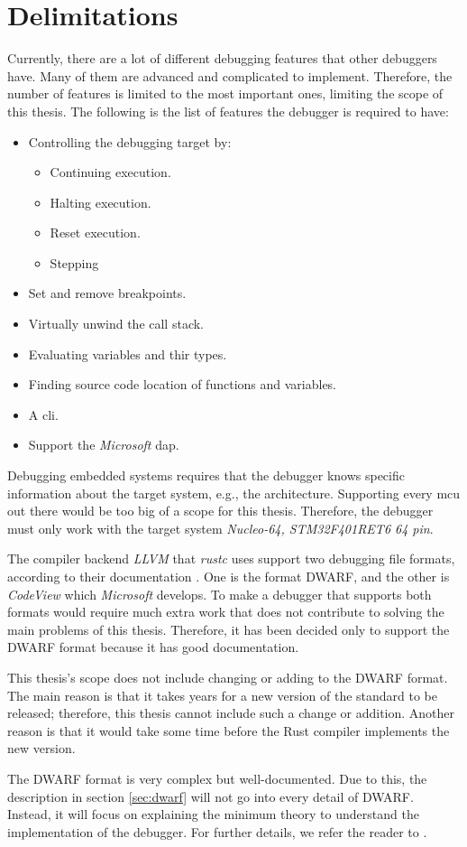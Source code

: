 \section{Delimitations}
\label{sec:delimitations}
Currently, there are a lot of different debugging features that other debuggers have.
Many of them are advanced and complicated to implement.
Therefore, the number of features is limited to the most important ones, limiting the scope of this thesis.
The following is the list of features the debugger is required to have:


\begin{itemize} \label{list:debuggerfeatures}
  \item Controlling the debugging target by:
  \begin{itemize}
    \item Continuing execution.
    \item Halting execution.
    \item Reset execution.
    \item Stepping
  \end{itemize}
  \item Set and remove breakpoints.
  \item Virtually unwind the call stack.
  \item Evaluating variables and thir types.
  \item Finding source code location of functions and variables.
  \item A \acrfull{cli}.
  \item Support the \emph{Microsoft} \acrfull{dap}.
\end{itemize}


Debugging embedded systems requires that the debugger knows specific information about the target system, e.g., the architecture.
Supporting every \gls{mcu} out there would be too big of a scope for this thesis.
Therefore, the debugger must only work with the target system \emph{Nucleo-64, STM32F401RET6 64 pin}.


The compiler backend \emph{LLVM} that \emph{rustc} uses support two debugging file formats, according to their documentation \cite{llvm-dbs}.
One is the format \gls{DWARF}, and the other is \emph{CodeView} which \emph{Microsoft} develops.
To make a debugger that supports both formats would require much extra work that does not contribute to solving the main problems of this thesis.
Therefore, it has been decided only to support the \gls{DWARF} format because it has good documentation.


This thesis's scope does not include changing or adding to the \gls{DWARF} format.
The main reason is that it takes years for a new version of the standard to be released; therefore, this thesis cannot include such a change or addition.
Another reason is that it would take some time before the Rust compiler implements the new version.


The \gls{DWARF} format is very complex but well-documented.
Due to this, the description in section \ref{sec:dwarf} will not go into every detail of \gls{DWARF}.
Instead, it will focus on explaining the minimum theory to understand the implementation of the debugger.
For further details, we refer the reader to \cite{dwarf}.

